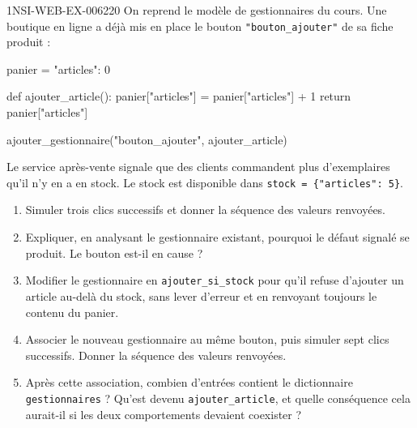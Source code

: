 \begin{exercice}{1NSI-WEB-EX-006}{2}{20}
On reprend le modèle de gestionnaires du cours. Une boutique en ligne a déjà mis
en place le bouton \lstinline{"bouton_ajouter"} de sa fiche produit :
\begin{python}
panier = {"articles": 0}

def ajouter_article():
    panier["articles"] = panier["articles"] + 1
    return panier["articles"]

ajouter_gestionnaire("bouton_ajouter", ajouter_article)
\end{python}
Le service après-vente signale que des clients commandent plus d'exemplaires
qu'il n'y en a en stock. Le stock est disponible dans
\lstinline!stock = {"articles": 5}!.
\begin{enumerate}
  \item Simuler trois clics successifs et donner la séquence des valeurs
    renvoyées.
  \item Expliquer, en analysant le gestionnaire existant, pourquoi le défaut
    signalé se produit. Le bouton est-il en cause ?
  \item Modifier le gestionnaire en \lstinline{ajouter_si_stock} pour qu'il
    refuse d'ajouter un article au-delà du stock, sans lever d'erreur et en
    renvoyant toujours le contenu du panier.
  \item Associer le nouveau gestionnaire au même bouton, puis simuler sept clics
    successifs. Donner la séquence des valeurs renvoyées.
  \item Après cette association, combien d'entrées contient le dictionnaire
    \lstinline{gestionnaires} ? Qu'est devenu \lstinline{ajouter_article}, et
    quelle conséquence cela aurait-il si les deux comportements devaient
    coexister ?
\end{enumerate}
\end{exercice}
